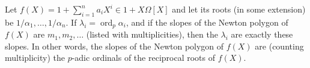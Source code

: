 Let $f(X) = 1 + \sum_{i=1}^n a_i X^i \in 1 + X\Omega[X]$ and let its roots (in some extension) be $1/\alpha_1, \ldots, 1/\alpha_n$. If $\lambda_i = \operatorname{ord}_p \alpha_i$, and if the slopes of the Newton polygon of $f(X)$ are $m_1, m_2, \ldots$ (listed with multiplicities), then the $\lambda_i$ are exactly these slopes. In other words, the slopes of the Newton polygon of $f(X)$ are (counting multiplicity) the $p$-adic ordinals of the reciprocal roots of $f(X)$.